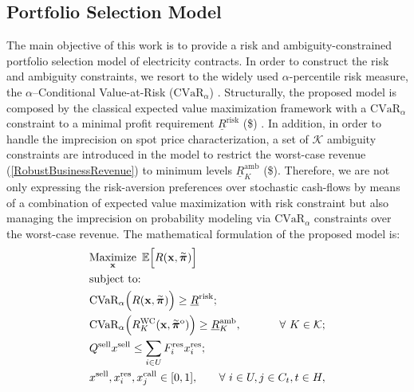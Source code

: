 \subsection{Portfolio Selection Model}
\label{PortfAllocaModel}

	The main objective of this work is to provide a risk and ambiguity-constrained portfolio selection model of electricity contracts. In order to construct the risk and ambiguity constraints, we resort to the widely used $\alpha$-percentile risk measure, the $\alpha$--Conditional Value-at-Risk ($\text{CVaR}_{\alpha}$) \cite{OptimizCVaR}. Structurally, the proposed model is composed by the classical expected value maximization framework with a $\text{CVaR}_{\alpha}$ constraint to a minimal profit requirement $\underline{R}^{\text{risk}}$ (\$) \cite{RiskConstPortSelect}. In addition, in order to handle the imprecision on spot price characterization, a set of $\mathcal{K}$ ambiguity constraints are introduced in the model to restrict the worst-case revenue (\ref{RobustBusinessRevenue}) to minimum levels $\underline{R}_{K}^{\text{amb}}$ (\$). Therefore, we are not only expressing the risk-aversion preferences over stochastic cash-flows by means of a combination of expected value maximization with risk constraint but also managing the imprecision on probability modeling via $\text{CVaR}_{\alpha}$ constraints over the worst-case revenue. The mathematical formulation of the proposed model is:
%
\begin{align}
	& \hspace{-0.06cm} \Maximize_{\substack{\mathbf{x}}} ~ \mathbb{E}\Big[R(\mathbf{x}, \accentset{\sim}{\boldsymbol{\pi}})\Big] \label{FullFirstLevel1} \\
	& \text{subject to:} \notag \\
	& \text{CVaR}_{\alpha}\Big(R(\mathbf{x}, \accentset{\sim}{\boldsymbol{\pi}})\Big) \geq \underline{R}^{\text{risk}}; \label{FullFirstLevel2} \\
	& \text{CVaR}_{\alpha}\Big(R_{K}^{\text{WC}}(\mathbf{x}, \accentset{\sim}{\boldsymbol{\pi}}^{\text{o}})\Big) \geq \underline{R}_{K}^{\text{amb}}, & \hspace{-1.00cm} \forall ~ K \in \mathcal{K}; \label{FullFirstLevel3} \\
	& Q^{\text{sell}} x^{\text{sell}} \leq \sum_{i \in U} F_{i}^{\text{res}} x^{\text{res}}_{i}; & \label{FullFirstLevel4} \\
	& x^{\text{sell}}, x_{i}^{\text{res}}, x_{j}^{\text{call}} \in [0,1], & \hspace{-1.00cm} \forall ~ i \in U, j \in C_{t}, t \in H, \label{FullFirstLevel5}
\end{align}
